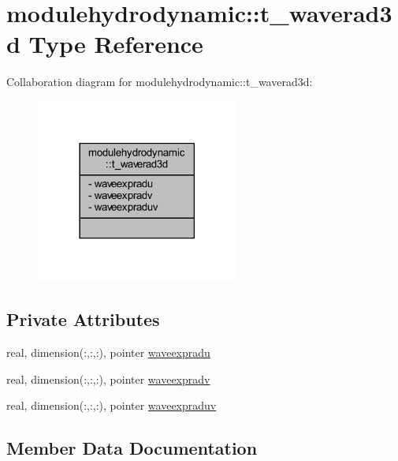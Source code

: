 \hypertarget{structmodulehydrodynamic_1_1t__waverad3d}{}\section{modulehydrodynamic\+:\+:t\+\_\+waverad3d Type Reference}
\label{structmodulehydrodynamic_1_1t__waverad3d}


Collaboration diagram for modulehydrodynamic\+:\+:t\+\_\+waverad3d\+:\nopagebreak
\begin{figure}[H]
\begin{center}
\leavevmode
\includegraphics[width=189pt]{structmodulehydrodynamic_1_1t__waverad3d__coll__graph}
\end{center}
\end{figure}
\subsection*{Private Attributes}
\begin{DoxyCompactItemize}
\item 
real, dimension(\+:,\+:,\+:), pointer \mbox{\hyperlink{structmodulehydrodynamic_1_1t__waverad3d_abb03f7455a73b47bfa9a0eff44b72c1b}{waveexpradu}}
\item 
real, dimension(\+:,\+:,\+:), pointer \mbox{\hyperlink{structmodulehydrodynamic_1_1t__waverad3d_a40d4d42334dc3ce15149a505d4c03564}{waveexpradv}}
\item 
real, dimension(\+:,\+:,\+:), pointer \mbox{\hyperlink{structmodulehydrodynamic_1_1t__waverad3d_a13df69527550ab18689f8b0565cf3caf}{waveexpraduv}}
\end{DoxyCompactItemize}


\subsection{Member Data Documentation}
\mbox{\label{structmodulehydrodynamic_1_1t__waverad3d_abb03f7455a73b47bfa9a0eff44b72c1b}} 
